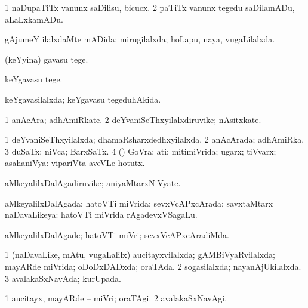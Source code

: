 \bentry
{} 
\gl{\sakirx}
\expl{}
\bmng
\bnum
\num{1} naDupaTiTx \mo vanunx saDilisu, bicucx. 
\num{2} paTiTx \mo vanunx tegedu saDilamADu, aLaLxkamADu. 
\enum
\emng
\eentry

\bentry
{} 
\gl{\gu}
\expl{}
\bmng
gAjumeY ilalxdaMte mADida; mirugilalxda; hoLapu, naya, \mo vugaLilalxda. 
\emng
\eentry

\bentry
{} 
\gl{\sakirx}
\expl{}
\bmng
 (keYyina) gavasu tege. 
\emng

\noindent
\gl{\akirx}
\expl{}
\bmng
keYgavasu tege. 
\emng
\eentry

\bentry
{} 
\gl{\gu}
\expl{}
\bmng
 keYgavasilalxda; keYgavasu tegeduhAkida. 
\emng
\eentry

\bentry
{} 
\gl{\nA}
\expl{}
\bmng
\bnum
\num{1} anAcAra; adhAmiRkate. 
\num{2} deYvaniSeThxyilalxdiruvike; nAsitxkate. 
\enum
\emng
\eentry

\bentry
{} 
\gl{\gu}
\bmng
\bnum
\num{1} deYvaniSeThxyilalxda; dhamaRsharxdedhxyilalxda. 
\num{2} anAcArada; adhAmiRka. 
\num{3} duSaTx; niVca; BarxSaTx. 
\num{4} (\AmA) GoVra; ati; mitimiVrida; ugarx; tiVvarx; asahaniVya:  vipariVta aveVLe hotutx. 
\enum
\emng
\eentry

\bentry
{} 
\gl{\nA}
\expl{}
\bmng
 aMkeyalilxDalAgadiruvike; aniyaMtarxNiVyate. 
\emng
\eentry

\bentry
{} 
\gl{\gu}
\expl{}
\bmng
 aMkeyalilxDalAgada; hatoVTi miVrida; sevxVcAPxcArada; savxtaMtarx naDavaLikeya:  hatoVTi miVrida rAgadevxVSagaLu. 
\emng
\eentry

\bentry
{} 
\gl{\kirxvi}
\expl{}
\bmng
 aMkeyalilxDalAgade; hatoVTi miVri; sevxVcAPxcAradiMda. 
\emng
\eentry

\bentry
{} 
\gl{\gu}
\expl{}
\bmng
\bnum
\num{1} (naDavaLike, mAtu, \mo vugaLalilx) aucitayxvilalxda; gAMBiVyaRvilalxda; mayARde miVrida; oDoDxDADxda; oraTAda. 
\num{2} sogasilalxda; nayanAjUkilalxda. 
\num{3} avalakaSxNavAda; kurUpada. 
\enum
\emng
\eentry

\bentry
{} 
\gl{\kirxvi}
\expl{}
\bmng
\bnum
\num{1} aucitayx, mayARde -- miVri; oraTAgi. 
\num{2} avalakaSxNavAgi. 
\enum
\emng
\eentry

